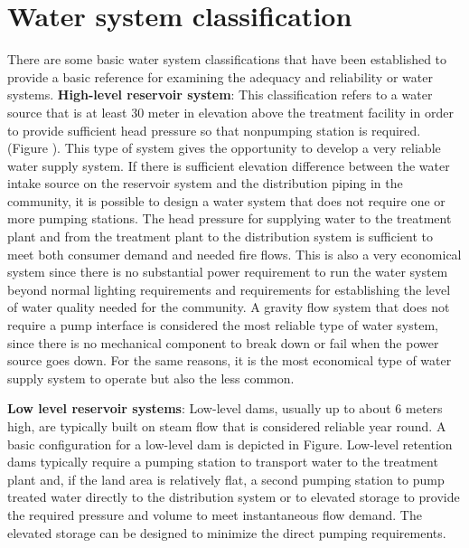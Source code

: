 \section{Water system classification}
There are some basic water system classifications that have been established to provide a basic 
reference for examining the adequacy and reliability or water systems. 
\bigbreak
\textbf{High-level reservoir system}: This classification refers to a water source that is at least 
30 meter in elevation above the treatment facility in order to provide sufficient head pressure 
so that nonpumping station is required. (Figure ). This type of system gives the opportunity to 
develop a very reliable water supply system. If there is sufficient elevation difference between
the water intake source on the reservoir system and the distribution piping in the community, 
it is possible to design a water system that does not require one or more pumping stations. 
The head pressure for supplying water to the treatment plant and from the treatment plant to 
the distribution system is sufficient to meet both consumer demand and needed fire flows. 
This is also a very economical system since there is no substantial power requirement to run 
the water system beyond normal lighting requirements and requirements for establishing the level
of water quality needed for the community. A gravity flow system that does not require a pump 
interface is considered the most reliable type of water system, since there is no mechanical 
component to break down or fail when the power source goes down. For the same reasons, it is the
most economical type of water supply system to operate but also the less common.


\begin{figure}
    
\end{figure}

\textbf{Low level reservoir systems}: Low-level dams, usually up to about 6 meters high, are typically 
built on steam flow that is considered reliable year round.  
A basic configuration for a low-level dam is depicted in Figure.  Low-level retention dams 
typically require a pumping station to transport water to the treatment plant and, if the land 
area is relatively flat, a second pumping station to pump treated water directly to the 
distribution system or to elevated storage to provide the required pressure and volume to meet 
instantaneous flow demand. The elevated storage can be designed to minimize the direct pumping 
requirements.


